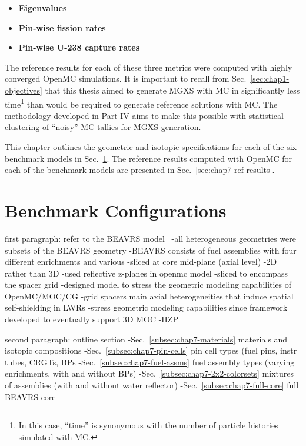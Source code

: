 \begin{itemize}[noitemsep,topsep=0pt]
  \item \textbf{Eigenvalues}
  \item \textbf{Pin-wise fission rates}
  \item \textbf{Pin-wise U-238 capture rates}
\end{itemize}

\noindent The reference results for each of these three metrics were computed with highly converged OpenMC simulations. It is important to recall from Sec.~\ref{sec:chap1-objectives} that this thesis aimed to generate \ac{MGXS} with \ac{MC} in significantly less time\footnote{In this case, ``time'' is synonymous with the number of particle histories simulated with \ac{MC}.} than would be required to generate reference solutions with \ac{MC}. The methodology developed in Part IV aims to make this possible with statistical clustering of ``noisy'' \ac{MC} tallies for \ac{MGXS} generation.

This chapter outlines the geometric and isotopic specifications for each of the six benchmark models in Sec.~\ref{sec:chap7-benchmarks}. The reference results computed with OpenMC for each of the benchmark models are presented in Sec.~\ref{sec:chap7-ref-results}.


\section{Benchmark Configurations}
\label{sec:chap7-benchmarks}

first paragraph: refer to the \ac{BEAVRS} model~\cite{horelik2013beavrs}
-all heterogeneous geometries were subsets of the \ac{BEAVRS} geometry
-\ac{BEAVRS} consists of fuel assemblies with four different enrichments and various
-sliced at core mid-plane (axial level)
-2D rather than 3D
  -used reflective z-planes in openmc model
  -sliced to encompass the spacer grid
    -designed model to stress the geometric modeling capabilities of OpenMC/MOC/CG
    -grid spacers main axial heterogeneities that induce spatial self-shielding in \ac{LWR}s
    -stress geometric modeling capabilities since framework developed to eventually support 3D \ac{MOC}
-HZP

second paragraph: outline section
-Sec.~\ref{subsec:chap7-materials} materials and isotopic compositions
-Sec.~\ref{subsec:chap7-pin-cells} pin cell types (fuel pins, instr tubes, \ac{CRGT}s, \ac{BP}s
-Sec.~\ref{subsec:chap7-fuel-assms} fuel assembly types (varying enrichments, with and without \ac{BP}s)
-Sec.~\ref{subsec:chap7-2x2-colorsets} mixtures of assemblies (with and without water reflector)
-Sec.~\ref{subsec:chap7-full-core} full \ac{BEAVRS} core


